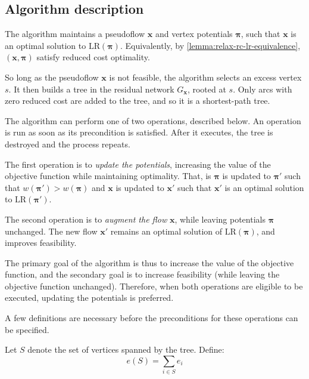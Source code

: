 \subsection{Algorithm description}

The algorithm maintains a pseudoflow $\mathbf{x}$ and vertex potentials $\boldsymbol{\pi}$, such that $\mathbf{x}$ is an optimal solution to $\mathrm{LR}(\boldsymbol{\pi})$. Equivalently, by \cref{lemma:relax-rc-lr-equivalence}, $\left(\mathbf{x},\boldsymbol{\pi}\right)$ satisfy reduced cost optimality.

So long as the pseudoflow $\mathbf{x}$ is not feasible, the algorithm selects an excess vertex $s$. It then builds a tree in the residual network $G_{\mathbf{x}}$, rooted at $s$. Only arcs with zero reduced cost are added to the tree, and so it is a shortest-path tree.

The algorithm can perform one of two operations, described below. An operation is run as soon as its precondition is satisfied. After it executes, the tree is destroyed and the process repeats.

The first operation is to \emph{update the potentials}, increasing the value of the objective function while maintaining optimality. That, is $\boldsymbol{\pi}$ is updated to $\boldsymbol{\pi}'$ such that $w\left(\boldsymbol{\pi}'\right) > w\left(\boldsymbol{\pi}\right)$ and $\mathbf{x}$ is updated to $\mathbf{x}'$ such that $\mathbf{x}'$ is an optimal solution to $\mathrm{LR}(\boldsymbol{\pi}')$.

The second operation is to \emph{augment the flow} $\mathbf{x}$, while leaving potentials $\boldsymbol{\pi}$ unchanged. The new flow $\mathbf{x}'$ remains an optimal solution of $\mathrm{LR}(\boldsymbol{\pi})$, and improves feasibility.

The primary goal of the algorithm is thus to increase the value of the objective function, and the secondary goal is to increase feasibility (while leaving the objective function unchanged). Therefore, when both operations are eligible to be executed, updating the potentials is preferred. 

A few definitions are necessary before the preconditions for these operations can be specified.\\

\begin{defn} \label{defn:relax-tree-excess}
Let $S$ denote the set of vertices spanned by the tree. Define:
\begin{equation} \label{eq:relax-tree-excess}
e(S) = \sum_{i \in S} e_i
\end{equation}
\end{defn}

